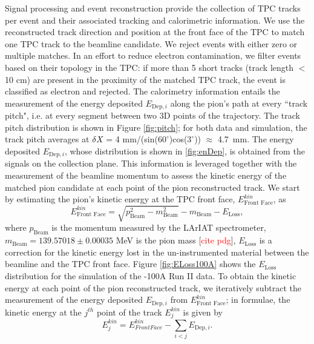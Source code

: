 \documentclass[aps,prl,twocolumn,showpacs,superscriptaddress,groupedaddress]{revtex4}  %
\begin{document}
Signal processing and event reconstruction provide the collection of TPC tracks per event and their associated tracking and calorimetric information. We use the reconstructed track direction and position at the front face of the TPC to match one TPC track to the beamline candidate. We reject events with either zero or multiple matches. In an effort to reduce electron contamination, we filter events based on their topology in the TPC: if more than 5 short tracks (track length $<$ 10 cm) are present in the proximity of the matched TPC track, the event is classified as electron and rejected. The calorimetry information entails the measurement of the energy deposited $E_{\text{Dep},i}$ along the pion's path at every ``track pitch", i.e. at every segment between two 3D points of the trajectory. The track pitch distribution is shown in Figure \ref{fig:pitch}; for both data and simulation, the track pitch averages at $\delta {\emph{X}}$ = 4 mm/(sin($60^{\circ}$)cos($3^{\circ}$)) $\approx$ 4.7~mm. 
The energy deposited $E_{\text{Dep},i}$, whose distribution is shown in \ref{fig:enDep}, is obtained from the signals on the collection plane.  This information is leveraged together with the measurement of the beamline momentum to assess the kinetic energy of the matched pion candidate at each point of the pion reconstructed track. We start by estimating the pion's  kinetic energy at the TPC front face, $ E^{kin}_{\text{Front Face}}$, as 
\begin{equation}
 E^{kin}_{\text{Front Face}}  = \sqrt{p^2_{\text{Beam}} - m^2_{\text{Beam}}} - m_{\text{Beam}} - E_{\text{Loss}},
\label{eq:enFF}
\end{equation}
where $p_{\text{Beam}}$ is the momentum measured by the LArIAT spectrometer, $m_{\text{Beam}} = 139.57018\pm0.00035$ MeV is the pion mass [\textcolor{red}{cite pdg}], $E_{\text{Loss}}$ is a correction for the kinetic energy lost in the un-instrumented material between the beamline and the TPC front face. Figure \ref{fig:ELoss100A} shows the $E_{\text{Loss}}$ distribution for the simulation of the -100A Run II data. To obtain the kinetic energy at each point of the pion reconstructed track, we iteratively subtract the measurement of the energy deposited $E_{\text{Dep},i}$ from $ E^{kin}_{\text{Front Face}}$; in formulae, the kinetic energy at the $j^{th}$ point of the track  $E_{j}^{kin}$ is given by
\begin{equation}
 E_{j}^{kin} =  E^{kin}_{Front Face} - \sum_{i < j} E_{\text{Dep},i}.
\label{eq:KEj}
\end{equation}
\end{document}
